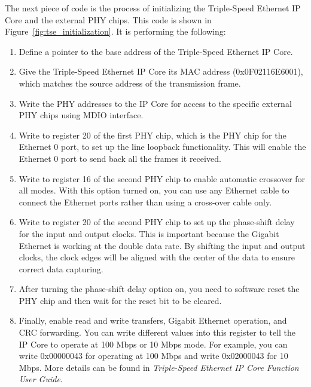 \documentclass[11pt, twoside, pdftex]{article}
\begin{document}
The next piece of code is the process of initializing the Triple-Speed Ethernet IP Core and the external PHY chips. This code is shown in Figure~\ref{fig:tse_initialization}. It is performing the following:
\begin{enumerate}
	\item Define a pointer to the base address of the Triple-Speed Ethernet IP Core.
	\item Give the Triple-Speed Ethernet IP Core its MAC address (0x0F02116E6001), which matches the source address of the transmission frame. 
	\item Write the PHY addresses to the IP Core for access to the specific external PHY chips using MDIO interface. 
	\item Write to register 20 of the first PHY chip, which is the PHY chip for the Ethernet 0 port, to set up the line loopback functionality. This will enable the Ethernet 0 port to send back all the frames it received.
	\item Write to register 16 of the second PHY chip to enable automatic crossover for all modes. With this option turned on, you can use any Ethernet cable to connect the Ethernet ports rather than using a cross-over cable only.
	\item Write to register 20 of the second PHY chip to set up the phase-shift delay for the input and output clocks. This is important because the Gigabit Ethernet is working at the double data rate. By shifting the input and output clocks, the clock edges will be aligned with the center of the data to ensure correct data capturing. 
	\item After turning the phase-shift delay option on, you need to software reset the PHY chip and then wait for the reset bit to be cleared. 
	\item Finally, enable read and write transfers, Gigabit Ethernet operation, and CRC forwarding. You can write different values into this register to tell the IP Core to operate at 100 Mbps or 10 Mbps mode. For example, you can write 0x00000043 for operating at 100 Mbps and write 0x02000043 for 10 Mbps. More details can be found in {\it Triple-Speed Ethernet IP Core Function User Guide}. 
\end{enumerate}
\end{document}

